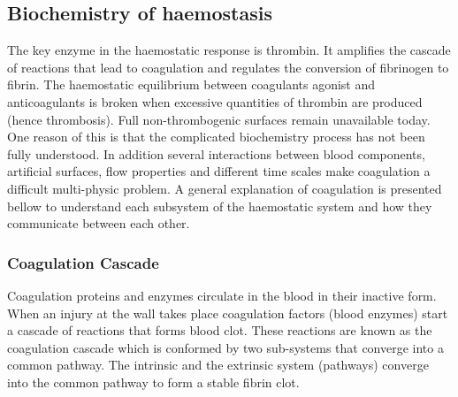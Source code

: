 \documentclass[%
 nofootinbib,
 amsmath,amssymb,
 aps,
 pra,
]{revtex4-1}
\begin{document}
\subsection{ \label{sec:chemical} Biochemistry of haemostasis}
The key enzyme in the haemostatic response is thrombin. It amplifies the cascade of reactions that lead to coagulation and regulates the conversion of fibrinogen to fibrin. The haemostatic equilibrium between coagulants agonist and anticoagulants is broken when excessive quantities of thrombin are produced (hence thrombosis). Full non-thrombogenic  surfaces remain unavailable today. One reason of this is that the complicated biochemistry process has not been fully understood. In addition several interactions between blood components, artificial surfaces, flow properties and different time scales make coagulation a difficult multi-physic problem. A general explanation of coagulation is presented bellow to understand each subsystem of the haemostatic system and how they communicate between each other.
\subsubsection{Coagulation Cascade}
Coagulation proteins and enzymes circulate in the blood in their inactive form. When an injury at the wall takes place coagulation factors (blood enzymes) start a cascade of reactions that forms blood clot. These reactions are known as the coagulation cascade which is conformed by two sub-systems that converge into a common pathway. The intrinsic and the extrinsic system (pathways) converge into the common pathway to form a stable fibrin clot.\\
\end{document}
